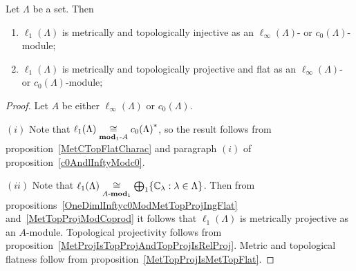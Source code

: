 \begin{proposition}\label{c0AndlInftyModl1} Let $\Lambda$ be a set. Then

\begin{enumerate}[label = (\roman*)]
    \item $\ell_1(\Lambda)$ is metrically and topologically injective as
    an $\ell_\infty(\Lambda)$- or $c_0(\Lambda)$-module;

    \item $\ell_1(\Lambda)$ is metrically and topologically projective and 
    flat as an $\ell_\infty(\Lambda)$- or $c_0(\Lambda)$-module;
\end{enumerate}
\end{proposition}
\begin{proof} Let $A$ be either $\ell_\infty(\Lambda)$ or $c_0(\Lambda)$.

$(i)$ Note that $\ell_1(\Lambda)\mathrel{\mathop{\cong}\limits_{\mathbf{mod}_1\text{-}A}}{c_0(\Lambda)}^*$, so the
result follows from proposition~\ref{MetCTopFlatCharac} and paragraph $(i)$ of
proposition~\ref{c0AndlInftyModc0}.

$(ii)$ Note that 
$\ell_1(\Lambda)
\mathrel{\mathop{\cong}\limits_{A\text{-}\mathbf{mod}_1}}
\bigoplus_1 \{\mathbb{C}_\lambda:\lambda\in\Lambda \}$. Then from
propositions~\ref{OneDimlInftyc0ModMetTopProjIngFlat}
and~\ref{MetTopProjModCoprod} it follows that $\ell_1(\Lambda)$ is metrically
projective as an $A$-module. Topological projectivity follows from
proposition~\ref{MetProjIsTopProjAndTopProjIsRelProj}. Metric and topological
flatness follow from proposition~\ref{MetTopProjIsMetTopFlat}.
\end{proof}

